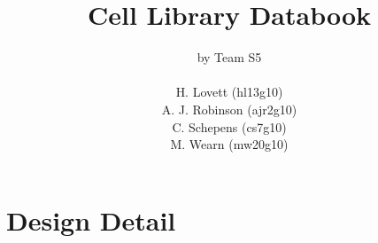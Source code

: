 \documentclass{desex3}         %
\newcommand{\cellname}[1] {\clearpage \section{#1} \makebox[\linewidth]{\rule{\textwidth}{0.4pt}}}
\begin{document}
\title{Cell Library Databook}

\author{by Team S5\\ \\ H. Lovett (hl13g10) \\ A. J. Robinson (ajr2g10) \\ C. Schepens (cs7g10) \\ M. Wearn (mw20g10)}
\maketitle
\cleardoublepage
\tableofcontents
















%

%


%
%
%
%




\appendix


\clearpage
\section{Design Detail}
\renewcommand{\cellname}[1] {\newpage \subsection{#1} \makebox[\linewidth]{\rule{\textwidth}{0.4pt}}}
\newcommand{\stickdiagram}[1]{\subsubsection*{Stick Diagram} \texttt{[image: \#1]}}
\newcommand{\transistor}[1]{\subsubsection*{Transistor Level Circuit Diagram} \texttt{[image: \#1]}}
\newcommand{\spicesim}[1]{\subsubsection*{HSpice Simulation} \texttt{[image: \#1]}}








\end{document}
